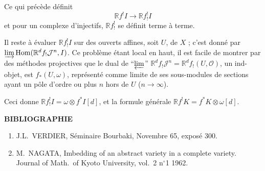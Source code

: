 \documentclass[12pt]{amsart}
\theoremstyle{plain}
\theoremstyle{definition}
\DeclareMathOperator{\Hom}{Hom}
\newcommand{\cJ}{\mathcal{J}}
\newcommand{\cO}{\mathcal{O}}
\newcommand{\bR}{\mathbb{R}}
\begin{document}
Ce qui pr\'ec\`ede d\'efinit
\[
\bR f^{!}I \to \bR f^{!}_{!}I
\]
et pour un complexe d'injectifs, $\bR f^{!}_{!}$ se d\'efinit terme \`a terme.

Il reste \`a \'evaluer $\bR f^{!}_{!}I$ sur des ouverts affines, soit $U$, de $X$ ; c'est donn\'e par $\varinjlim \Hom(\bR^{d}f_{!}\cJ^{n}, I)$. Ce probl\`eme \'etant local en haut, il est facile de montrer par des m\'ethodes projectives que le dual de ``$\varprojlim$'' $\bR^{d}f_{!}\cJ^{n} = \bR^{d}f_{!}(U,\cO)$, un ind-objet, est $f_{*}(U,\omega)$, repr\'esent\'e comme limite de ses sous-modules de sections ayant un p\^ole d'ordre ou plus $n$ hors de $U$ ($n \to \infty$).

Ceci donne $\bR f^{!}_{!}I = \omega \otimes f^{*}I[d]$, et la formule g\'en\'erale $\bR f^{!}K = f^{*}K \otimes \omega[d]$.

\bigskip

\begin{center}
\textbf{BIBLIOGRAPHIE}
\end{center}

\begin{enumerate}
\item[{[1]}] J.L.\ VERDIER, S\'eminaire Bourbaki, Novembre 65, expos\'e 300.
\item[{[2]}] M.\ NAGATA, Imbedding of an abstract variety in a complete variety. Journal of Math.\ of Kyoto University, vol.\ 2 n$^{\circ}$1 1962.
\end{enumerate}
\end{document}

